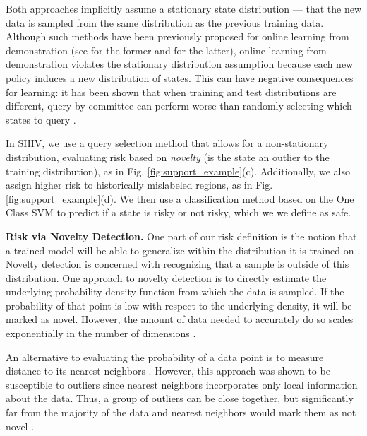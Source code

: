 \documentclass[10pt, conference]{ieeeconf}      %
\begin{document}
Both approaches implicitly assume a stationary state distribution --- that the new data is sampled from the same distribution as the previous training data. Although such methods have been previously proposed for online learning from demonstration (see \cite{chernova2009interactive,grollman2007dogged} for the former and \cite{judah2011active,judah2012active} for the latter),
online learning from demonstration violates the stationary distribution assumption because each new policy induces a new distribution of states. This can have negative consequences for learning: it has been shown that when training and test distributions are different, query by committee can perform worse than randomly selecting  which states to query \cite{burbidge2007active}.

In SHIV, we use a query selection method that allows for a non-stationary distribution, evaluating risk based on \emph{novelty} (is the state an outlier to the training distribution), as in Fig. \ref{fig:support_example}(c). Additionally, we also assign higher risk to  historically mislabeled regions, as in Fig. \ref{fig:support_example}(d). We then use a classification method based on the One Class SVM \cite{scholkopf2001estimating} to predict if a state is risky or not risky, which we we define as safe.%

\noindent\textbf{Risk via Novelty Detection.}
One part of our risk definition is the notion that a trained model will be able to generalize within the distribution it is
trained on \cite{tokdar2010importance}. Novelty detection \cite{hodge2004survey} is concerned with recognizing that a sample is outside of this distribution.
One approach to novelty detection is to directly estimate the underlying probability density function from which the data is sampled. If the probability of that point is low with respect to the underlying density, it will be marked as novel. However, the amount of data needed to accurately do so scales exponentially in the number of dimensions \cite{nadaraya1964estimating}.

An alternative to evaluating the probability of a data point is to measure distance to its nearest neighbors \cite{knox1998algorithms}. However, this approach was shown to be
susceptible to outliers since nearest neighbors  incorporates only local information about the data. Thus, a group of outliers can be close together, but significantly far from the majority of the data and nearest neighbors would mark them as not novel \cite{hodge2004survey}.
\end{document}
